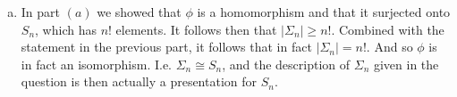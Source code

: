 \documentclass[12pt,letterpaper,boxed]{hmcpset}
\newcommand{\abs}[1]{\left|#1\right|}
\begin{document}
\begin{solution}
\begin{enumerate}[(a)]
\item In part $(a)$ we showed that $\phi$ is a homomorphism and that
it surjected onto $S_n$, which has $n!$ elements. It follows then that
$\abs{\Sigma_n} \geq n!$. Combined with the statement in the previous
part, it follows that in fact $\abs{\Sigma_n} = n!$. And so $\phi$ is
in fact an isomorphism. I.e. $\Sigma_n \cong S_n$, and the description
of $\Sigma_n$ given in the question is then actually a presentation
for $S_n$. 



\end{enumerate}
\end{solution}

\newpage
\end{document}
